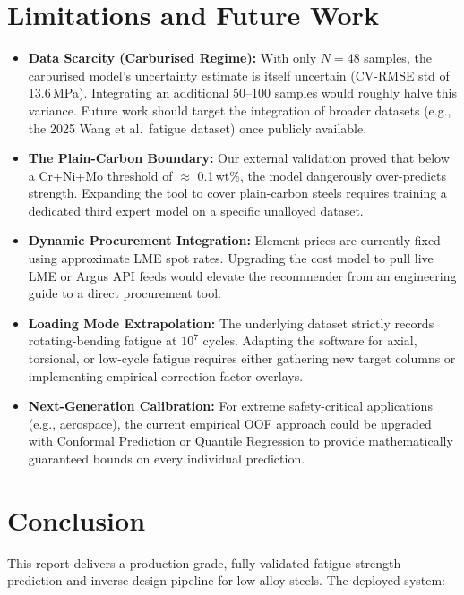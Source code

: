 \documentclass[12pt,a4paper]{article}
\begin{document}
\section{Limitations and Future Work}

\begin{itemize}
  \item \textbf{Data Scarcity (Carburised Regime):} With only $N=48$ samples, the carburised model's uncertainty estimate is itself uncertain (CV-RMSE std of 13.6\,MPa). Integrating an additional 50--100 samples would roughly halve this variance. Future work should target the integration of broader datasets (e.g., the 2025 Wang et al.\ fatigue dataset) once publicly available.
  \item \textbf{The Plain-Carbon Boundary:} Our external validation proved that below a Cr+Ni+Mo threshold of $\approx$ 0.1\,wt\%, the model dangerously over-predicts strength. Expanding the tool to cover plain-carbon steels requires training a dedicated third expert model on a specific unalloyed dataset.
  \item \textbf{Dynamic Procurement Integration:} Element prices are currently fixed using approximate LME spot rates. Upgrading the cost model to pull live LME or Argus API feeds would elevate the recommender from an engineering guide to a direct procurement tool.
  \item \textbf{Loading Mode Extrapolation:} The underlying dataset strictly records rotating-bending fatigue at $10^7$ cycles. Adapting the software for axial, torsional, or low-cycle fatigue requires either gathering new target columns or implementing empirical correction-factor overlays.
  \item \textbf{Next-Generation Calibration:} For extreme safety-critical applications (e.g., aerospace), the current empirical OOF approach could be upgraded with Conformal Prediction or Quantile Regression to provide mathematically guaranteed bounds on every individual prediction.
\end{itemize}

\section{Conclusion}

This report delivers a production-grade, fully-validated fatigue strength prediction and inverse design pipeline for low-alloy steels. The deployed system:
\end{document}
